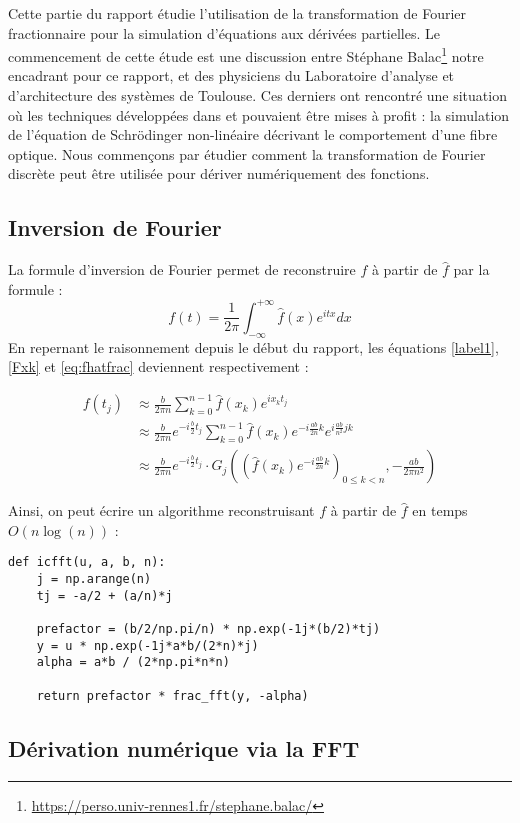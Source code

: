 \documentclass{article}
\begin{document}
Cette partie du rapport étudie l'utilisation de la transformation de Fourier fractionnaire pour la simulation d'équations aux dérivées partielles. 
Le commencement de cette étude est une discussion entre Stéphane Balac\footnote{\url{https://perso.univ-rennes1.fr/stephane.balac/}} notre encadrant pour ce rapport, et des physiciens du Laboratoire d'analyse et d'architecture des systèmes de Toulouse. 
Ces derniers ont rencontré une situation où les techniques développées dans \cite{FRAC} et \cite{FOURINT} pouvaient être mises à profit : la simulation de l'équation de Schrödinger non-linéaire décrivant le comportement d'une fibre optique. Nous commençons par étudier comment la transformation de Fourier discrète peut être utilisée pour dériver numériquement des fonctions.

\subsection{Inversion de Fourier}

La formule d'inversion de Fourier permet de reconstruire $f$ à partir de $\hat{f}$ par la formule :
$$ f(t) = \frac{1}{2\pi}\int_{-\infty}^{+\infty} \hat{f}(x)e^{itx}dx $$
En repernant le raisonnement depuis le début du rapport, les équations \eqref{label1}, \eqref{Fxk} et \eqref{eq:fhatfrac} deviennent respectivement :

\begin{align*}
f(t_j)  &\approx \frac{b}{2\pi n}\sum_{k=0}^{n-1}\hat{f}(x_k)e^{i x_k t_j} \\
      &\approx \frac{b}{2\pi n} e^{-i\frac{b}{2}t_j}\sum_{k=0}^{n-1}\hat{f}(x_k)e^{-i\frac{ab}{2n}k}e^{i\frac{ab}{n^2}jk} \\
      &\approx \frac{b}{2\pi n} e^{-i\frac{b}{2}t_j}\cdot G_j\left(\left( \hat{f}(x_k)e^{-i\frac{ab}{2n}k}\right)_{0 \le k < n},  -\frac{ab}{2\pi n^2}\right) 
\end{align*}

Ainsi, on peut écrire un algorithme reconstruisant $f$ à partir de $\hat{f}$ en temps $O(n\log(n))$ : 
\begin{verbatim}
def icfft(u, a, b, n):
    j = np.arange(n)
    tj = -a/2 + (a/n)*j
    
    prefactor = (b/2/np.pi/n) * np.exp(-1j*(b/2)*tj)
    y = u * np.exp(-1j*a*b/(2*n)*j)
    alpha = a*b / (2*np.pi*n*n)
    
    return prefactor * frac_fft(y, -alpha)
\end{verbatim}

\subsection{Dérivation numérique via la FFT}
\end{document}
